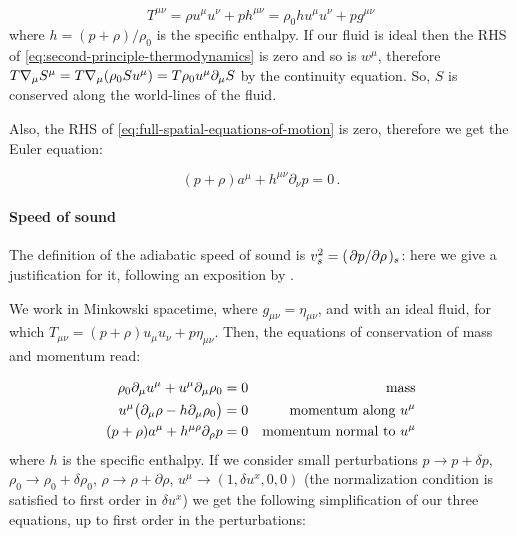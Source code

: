 \documentclass[main.tex]{subfiles}
\begin{document}
\begin{equation}
    T^{\mu\nu} = \rho u^\mu u^\nu + p h^{\mu\nu} = \rho_0 h u^{\mu} u^\nu + p g^{\mu\nu}
\end{equation}
where \(h = (p + \rho) / \rho_0\) is the specific enthalpy.
If our fluid is ideal then the RHS of \eqref{eq:second-principle-thermodynamics} is zero and so is \(w^\mu\),
therefore \(T \nabla_\mu S^\mu = T \nabla_\mu \qty(\rho_0 S u^\mu) = T \rho_0 u^\mu \partial_\mu S\) by the continuity equation.
So, \(S\) is conserved along the world-lines of the fluid.

Also, the RHS of \eqref{eq:full-spatial-equations-of-motion} is zero, therefore we get the Euler equation:

\begin{equation} \label{eq:relativistic-euler}
    (p+\rho) a^\mu + h^{\mu \nu} \partial_\nu p =0 \,.
\end{equation}

\paragraph{Speed of sound}

The definition of the adiabatic speed of sound is \(v_s^2 = (\pdv*{p}{\rho})_s\): here we give a justification for it, following an exposition by \textcite[]{Yoshida:2011}.

We work in Minkowski spacetime, where \(g_{\mu\nu} = \eta_{\mu\nu}\), and with an ideal fluid, for which \(T_{\mu\nu} = (p+ \rho) u_\mu u_\nu + p \eta_{\mu\nu}\). Then, the equations of conservation of mass and momentum read:

\begin{subequations}
\begin{align}
  \rho_0 \partial_\mu u^\mu + u^\mu \partial_\mu \rho_0 &= 0 & \text{mass}  \\
  u^\mu \qty(\partial_\mu \rho - h \partial_\mu \rho_0) &=0 & \text{momentum along } u^\mu  \\
  (p+\rho) a^\mu + h^{\mu \rho} \partial_\rho p &=0 & \text{momentum normal to } u^{\mu}
\end{align}
\end{subequations}
%
where \(h\) is the specific enthalpy.
If we consider small perturbations \(p \rightarrow p + \delta p\), \(\rho_0 \rightarrow \rho_0 + \delta \rho_0\), \(\rho \rightarrow \rho + \partial \rho\), \(u^\mu \rightarrow (1, \delta u^x, 0, 0)\)
(the normalization condition is satisfied to first order in \(\delta u^x\))
we get the following simplification of our three equations, up to first order in the perturbations:
\end{document}
